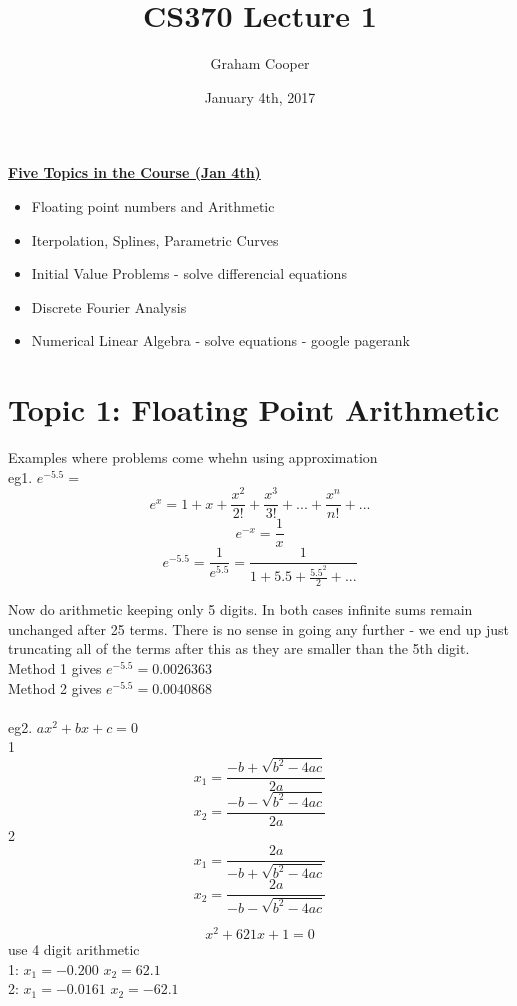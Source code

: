 \documentclass[12pt]{article}
\title{\vspace{-15ex}CS370 Lecture 1\vspace{-1ex}}
\date{January 4th, 2017}
\author{Graham Cooper}
\newcommand{\myt}[1]{\textbf{\underline{#1}}}
\begin{document}
	\maketitle
	\myt{Five Topics in the Course (Jan 4th)}
	\begin{itemize}
		\item Floating point numbers and Arithmetic
		\item Iterpolation, Splines, Parametric Curves
		\item Initial Value Problems - solve differencial equations
		\item Discrete Fourier Analysis
		\item Numerical Linear Algebra - solve equations - google pagerank
	\end{itemize}

	\section*{Topic 1: Floating Point Arithmetic}
	Examples where problems come whehn using approximation\\
	
	eg1. $e^{-5.5} = $\\
	
	$$e^x = 1 + x + \frac{x^2}{2!} + \frac{x^3}{3!} + ... + \frac{x^n}{n!} + ...$$
	$$e^{-x} = \frac{1}{x}$$
	$$e^{-5.5} = \frac{1}{e^{5.5}} = \frac{1}{1 + 5.5 + \frac{5.5^2}{2} + ...}$$
	
	Now do arithmetic keeping only 5 digits. In both cases infinite sums remain unchanged after 25 terms. There is no sense in going any further - we end up just truncating all of the terms after this as they are smaller than the 5th digit.\\
	
	Method 1 gives $e^{-5.5} = 0.0026363$\\
	Method 2 gives $e^{-5.5} = 0.0040868$\\\\
	
	eg2. $ax^2 + bx + c = 0$\\
	1
	$$x_1 = \frac{-b +\sqrt{b^2-4ac}}{2a}$$
	$$x_2 = \frac{-b -\sqrt{b^2-4ac}}{2a}$$
	2
	$$x_1 = \frac{2a}{-b +\sqrt{b^2-4ac}}$$
	$$x_2 = \frac{2a}{-b -\sqrt{b^2-4ac}}$$
	
	$$x^2 + 621x + 1 = 0$$
	use 4 digit arithmetic\\
	
	1: $x_1 = -0.200$ $x_2 = 62.1$\\
	2: $x_1 = -0.0161$ $x_2 = -62.1$\\
	
\end{document}
